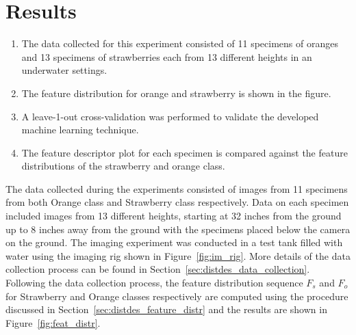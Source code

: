 \documentclass {udthesis}
\begin{document}
\section{Results}
\begin{enumerate}
	\item The data collected for this experiment consisted of 11 specimens of oranges and 13 specimens of strawberries each from 13 different heights in an underwater settings.
	
	\item The feature distribution for orange and strawberry is shown in the figure.
	
	\item A leave-1-out cross-validation was performed to validate the developed machine learning technique.
	
	\item The feature descriptor plot for each specimen is compared against the feature distributions of the strawberry and orange class.
\end{enumerate}

The data collected during the experiments consisted of images from 11 specimens from both Orange class and Strawberry class respectively. Data on each specimen included images from 13 different heights, starting at 32 inches from the ground up to 8 inches away from the ground with the specimens placed below the camera on the ground. The imaging experiment was conducted in a test tank filled with water using the imaging rig shown in Figure~\ref{fig:im_rig}. More details of the data collection process can be found in Section~\ref{sec:distdes_data_collection}. Following the data collection process, the feature distribution sequence $F_{s}$ and $F_{o}$ for Strawberry and Orange classes respectively are computed using the procedure discussed in Section~\ref{sec:distdes_feature_distr} and the results are shown in Figure~\ref{fig:feat_distr}.
\end{document}
